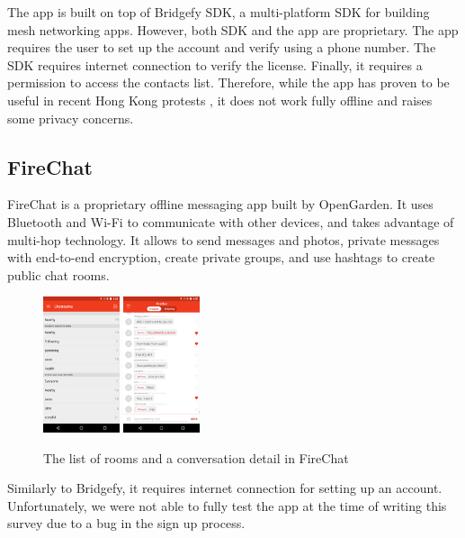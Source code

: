 \documentclass[conference,compsoc]{IEEEtran}
\begin{document}
The app is built on top of Bridgefy SDK, a multi-platform SDK for building mesh networking apps. However, both SDK and the app are proprietary. The app requires the user to set up the account and verify using a phone number. The SDK requires internet connection to verify the license. Finally, it requires a permission to access the contacts list. Therefore, while the app has proven to be useful in recent Hong Kong protests \cite{forbes:hk}, it does not work fully offline and raises some privacy concerns.

\subsection{FireChat}

FireChat is a proprietary offline messaging app built by OpenGarden. It uses Bluetooth and Wi-Fi to communicate with other devices, and takes advantage of multi-hop technology. It allows to send messages and photos, private messages with end-to-end encryption, create private groups, and use hashtags to create public chat rooms. \cite{firechat}

\begin{figure}[h]
  \centering
  \includegraphics[width=0.2\textwidth]{firechat1}
  \includegraphics[width=0.2\textwidth]{firechat2}
  \caption{The list of rooms and a conversation detail in FireChat \cite{firechat}}
\end{figure}

Similarly to Bridgefy, it requires internet connection for setting up an account. Unfortunately, we were not able to fully test the app at the time of writing this survey due to a bug in the sign up process.
\end{document}
